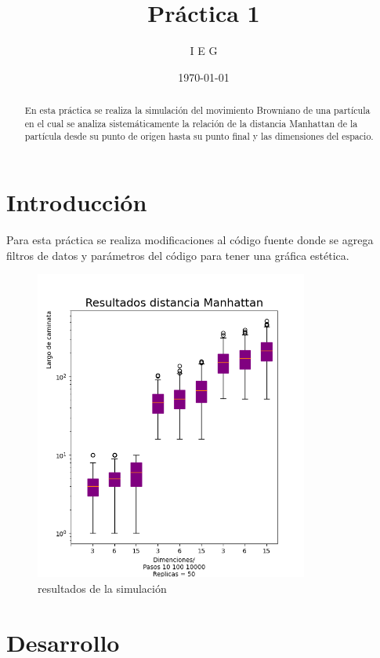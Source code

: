 \documentclass{article}
\author{I E G} %
\title{Práctica 1} %
\date{\today}
\begin{document}

\maketitle %

\begin{abstract} %
En esta práctica se realiza la simulación del movimiento Browniano de una partícula en el cual se analiza sistemáticamente la relación de la distancia Manhattan de la partícula desde su punto de origen hasta su punto final y las dimensiones del espacio.
\end{abstract}

\section{Introducci\'{o}n}\label{intro} %
 
Para esta práctica se realiza modificaciones al código fuente \cite{elis} donde se agrega filtros de datos y parámetros del código para tener una gráfica estética.




\begin{figure} %
    \centering
    \includegraphics[width=90mm]{figuraprac1.png} %
    \caption{resultados de la simulación}
    \label{grafica}
\end{figure}

\section{Desarrollo}
\end{document}
